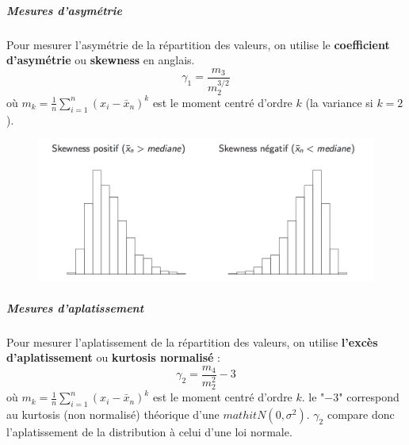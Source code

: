 \subparagraph{Mesures d'asymétrie }
Pour mesurer l'asymétrie de la répartition des valeurs, on utilise le \textbf{coefficient d'asymétrie} ou \textbf{skewness} en anglais.
$$\gamma_{1} = \frac{m_{3}}{m_{2}^{3/2}}$$
où $m_{k}=\frac{1}{n} \sum_{i=1}^{n} (x_{i} - \bar{x}_{n})^{k}$  est le moment centré d'ordre $k$ (la variance si $k = 2$).
\begin{figure}[H]\begin{center}\includegraphics[scale=0.5]{ilu/ccm6.png}\end{center}\end{figure}
\subparagraph{Mesures d'aplatissement} Pour mesurer l'aplatissement de la répartition des valeurs, on utilise \textbf{l'excès d'aplatissement} ou \textbf{kurtosis normalisé } :
$$\gamma_{2} = \frac{m_{4}}{m_{2}^{2}} - 3$$
où $m_{k}=\frac{1}{n} \sum_{i=1}^{n} (x_{i} - \bar{x}_{n})^{k}$  est le moment centré d'ordre $k$.
le "$-3$" correspond au kurtosis (non normalisé) théorique d'une $mathit{N}(0,\sigma^{2})$. $\gamma_{2}$ compare donc l'aplatissement de la distribution à celui d'une loi normale.

